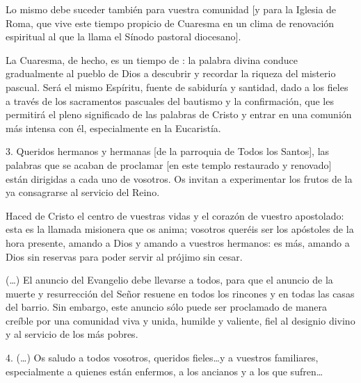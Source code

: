 \begin{body}
Lo mismo debe suceder también para vuestra comunidad [y para la Iglesia de Roma, que vive este tiempo propicio de Cuaresma en un clima de renovación espiritual al que la llama el Sínodo pastoral diocesano].

La Cuaresma, de hecho, es un tiempo de : la palabra divina conduce gradualmente al pueblo de Dios a descubrir y recordar la riqueza del misterio pascual. Será el mismo Espíritu, fuente de sabiduría y santidad, dado a los fieles a través de los sacramentos pascuales del bautismo y la confirmación, que les permitirá  el pleno significado de las palabras de Cristo y entrar en una comunión más intensa con él, especialmente en la Eucaristía.

3. Queridos hermanos y hermanas [de la parroquia de Todos los Santos], las palabras que se acaban de proclamar [en este templo restaurado y renovado] están dirigidas a cada uno de vosotros. Os invitan a experimentar los frutos de la  ya consagrarse al servicio del Reino.

Haced de Cristo el centro de vuestras vidas y el corazón de vuestro apostolado: esta es la llamada misionera que os anima;  vosotros queréis ser los apóstoles de la hora presente, amando a Dios y amando a vuestros hermanos: es más, amando a Dios sin reservas para poder servir al prójimo sin cesar.

(\ldots) El anuncio del Evangelio debe llevarse a todos, para que el anuncio de la muerte y resurrección del Señor resuene en todos los rincones y en todas las casas del barrio. Sin embargo, este anuncio sólo puede ser proclamado de manera creíble por una comunidad viva y unida, humilde y valiente, fiel al designio divino y al servicio de los más pobres.

4.  (\ldots) Os saludo a todos vosotros, queridos fieles\ldots y a vuestros familiares, especialmente a quienes están enfermos, a los ancianos y a los que sufren\ldots


\end{body}
